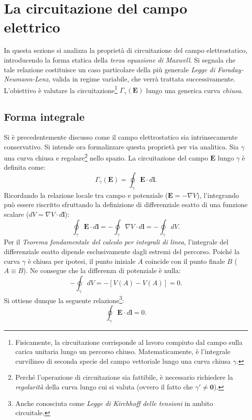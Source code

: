 \documentclass[a4paper,11pt]{report}
\begin{document}
\section{La circuitazione del campo elettrico}
In questa sezione si analizza la proprietà di circuitazione del campo elettrostatico, introducendo la forma statica della \textit{terza equazione di Maxwell}. 
Si segnala che tale relazione costituisce un caso particolare della più generale \textit{Legge di Faraday-Neumann-Lenz}, valida in regime variabile, che verrà trattata successivamente. L'obiettivo è valutare la circuitazione\footnote{Fisicamente, la circuitazione corrisponde al lavoro compiuto dal campo sulla carica unitaria lungo un percorso chiuso. Matematicamente, è l'integrale curvilineo di seconda specie del campo vettoriale lungo una curva chiusa $\gamma$.} $\Gamma_\gamma(\bm{E})$ lungo una generica curva \emph{chiusa}.

\subsection{Forma integrale}
Si è precedentemente discusso come il campo elettrostatico sia intrinsecamente conservativo. Si intende ora formalizzare questa proprietà per via analitica.
Sia $\gamma$ una curva chiusa e regolare\footnote{Perché l'operazione di circuitazione sia fattibile, è necessario richiedere la \emph{regolarità} della curva lungo cui si valuta (ovvero il fatto che $\gamma' \neq \bm{0}$).} nello spazio. La circuitazione del campo $\bm{E}$ lungo $\gamma$ è definita come:
\begin{equation}
    \Gamma_{\gamma}(\bm{E}) = \oint_{\gamma} \bm{E} \cdot d\bm{l}.
\end{equation}
Ricordando la relazione locale tra campo e potenziale ($\bm{E} = -\nabla V$), l'integrando può essere riscritto sfruttando la definizione di differenziale esatto di una funzione scalare ($dV = \nabla V \cdot d\bm{l}$):
\begin{equation}
    \oint_{\gamma} \bm{E} \cdot d\bm{l} = -\oint_{\gamma} \nabla V \cdot d\bm{l} = -\oint_{\gamma} dV.
\end{equation}
Per il \textit{Teorema fondamentale del calcolo per integrali di linea}, l'integrale del differenziale esatto dipende esclusivamente dagli estremi del percorso. Poiché la curva $\gamma$ è chiusa per ipotesi, il punto iniziale $A$ coincide con il punto finale $B$ ($A \equiv B$). Ne consegue che la differenza di potenziale è nulla:
\begin{equation}
    -\oint_{\gamma} dV = -[V(A) - V(A)] = 0.
\end{equation}
Si ottiene dunque la seguente relazione\footnote{Anche conosciuta come \textit{Legge di Kirchhoff delle tensioni} in ambito circuitale.}:
\begin{equation}
    \boxed{\oint_{\gamma} \bm{E} \cdot d\bm{l} = 0}.
    \label{eq:circuitazione_nulla}
\end{equation}
\end{document}
